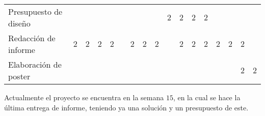 \begin{table}[H]
{\begin{tabular}{|l|llllllllllllllll|}
Presupuesto de diseño &  &  &  &  &  &  &  &   & \cellcolor[HTML]{C0504D}$2$ & \cellcolor[HTML]{C0504D}$2$ & \cellcolor[HTML]{C0504D}$2$ & \cellcolor[HTML]{C0504D}$2$ &  &  & \multicolumn{1}{|l|}{} &  \\
Redacción de informe & \cellcolor[HTML]{9BBB59}$2$ & \cellcolor[HTML]{9BBB59}$2$ & {\cellcolor[HTML]{9BBB59}$2$} & {\cellcolor[HTML]{9BBB59}$2$} &  & \cellcolor[HTML]{9BBB59}$2$ & {\cellcolor[HTML]{9BBB59}$2$} & {\cellcolor[HTML]{9BBB59}$2$} &  & \cellcolor[HTML]{9BBB59}
$2$ & \cellcolor[HTML]{9BBB59}$2$ & \cellcolor[HTML]{9BBB59}$2$ & {\cellcolor[HTML]{9BBB59}$2$} & \cellcolor[HTML]{9BBB59}$2$ & \multicolumn{1}{|l|}{\cellcolor[HTML]{9BBB59}$2$} &  \\
Elaboración de poster &  &  &  &  &  &  &  &  &  &  &  &  &  &  & \multicolumn{1}{|l|}{\cellcolor[HTML]{538DD5}$2$} & \cellcolor[HTML]{538DD5}$2$ \\ \hline
\end{tabular}%
}
\end{table}
\noindent 
Actualmente el proyecto se encuentra en la semana $15$, en la cual se hace la última entrega de informe, teniendo ya una solución y un presupuesto de este.